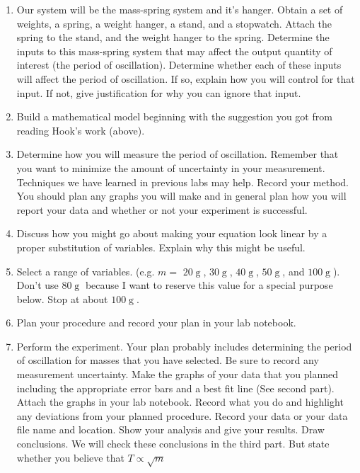 \documentclass{book}
\begin{document}
\begin{enumerate}
\item Our system will be the mass-spring system and it's hanger. Obtain a set
of weights, a spring, a weight hanger, a stand, and a stopwatch. Attach the
spring to the stand, and the weight hanger to the spring. Determine the inputs
to this mass-spring system that may affect the output quantity of interest
(the period of oscillation). Determine whether each of these inputs will
affect the period of oscillation. If so, explain how you will control for that
input. If not, give justification for why you can ignore that input.

\item Build a mathematical model beginning with the suggestion you got from
reading Hook's work (above).

\item Determine how you will measure the period of oscillation. Remember that
you want to minimize the amount of uncertainty in your measurement. Techniques
we have learned in previous labs may help. Record your method. You should plan
any graphs you will make and in general plan how you will report your data and
whether or not your experiment is successful.

\item Discuss how you might go about making your equation look linear by a
proper substitution of variables. Explain why this might be useful.

\item Select a range of variables. (e.g. $m=$ $20
\operatorname{g}
$, $30
\operatorname{g}
$, $40
\operatorname{g}
$, $50
\operatorname{g}
$, and $100
\operatorname{g}
$). Don't use $80
\operatorname{g}
$ because I want to reserve this value for a special purpose below. Stop at
about $100
\operatorname{g}
.$

\item Plan your procedure and record your plan in your lab notebook.

\item Perform the experiment. Your plan probably includes determining the
period of oscillation for masses that you have selected. Be sure to record any
measurement uncertainty. Make the graphs of your data that you planned
including the appropriate error bars and a best fit line (See second part). Attach the graphs in your lab notebook.
Record what you do and highlight any deviations from your planned procedure.
Record your data or your data file name and location. Show your analysis and
give your results. Draw conclusions. We will check these conclusions in the
third part. But state whether you believe that $T\varpropto\sqrt{m}$
\end{enumerate}
\end{document}
